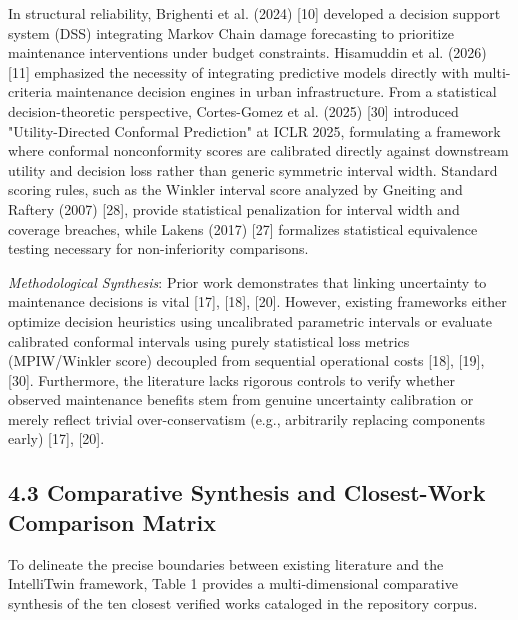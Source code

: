 \documentclass[12pt,a4paper]{article}
\begin{document}
In structural reliability, Brighenti et al. (2024) [10] developed a decision support system (DSS) integrating Markov Chain damage forecasting to prioritize maintenance interventions under budget constraints. Hisamuddin et al. (2026) [11] emphasized the necessity of integrating predictive models directly with multi-criteria maintenance decision engines in urban infrastructure. From a statistical decision-theoretic perspective, Cortes-Gomez et al. (2025) [30] introduced "Utility-Directed Conformal Prediction" at ICLR 2025, formulating a framework where conformal nonconformity scores are calibrated directly against downstream utility and decision loss rather than generic symmetric interval width. Standard scoring rules, such as the Winkler interval score analyzed by Gneiting and Raftery (2007) [28], provide statistical penalization for interval width and coverage breaches, while Lakens (2017) [27] formalizes statistical equivalence testing necessary for non-inferiority comparisons.

\textit{Methodological Synthesis}: Prior work demonstrates that linking uncertainty to maintenance decisions is vital [17], [18], [20]. However, existing frameworks either optimize decision heuristics using uncalibrated parametric intervals or evaluate calibrated conformal intervals using purely statistical loss metrics (MPIW/Winkler score) decoupled from sequential operational costs [18], [19], [30]. Furthermore, the literature lacks rigorous controls to verify whether observed maintenance benefits stem from genuine uncertainty calibration or merely reflect trivial over-conservatism (e.g., arbitrarily replacing components early) [17], [20].

\subsection*{4.3 Comparative Synthesis and Closest-Work Comparison Matrix}
To delineate the precise boundaries between existing literature and the IntelliTwin framework, Table 1 provides a multi-dimensional comparative synthesis of the ten closest verified works cataloged in the repository corpus.
\end{document}
